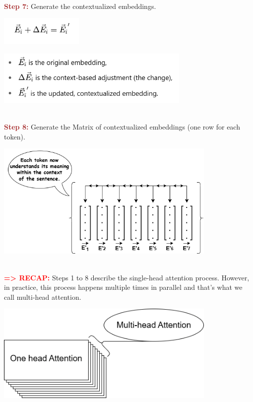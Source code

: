 \documentclass[12pt]{article}
\begin{document}
\textcolor{brown}{\textbf{\\Step 7: }} Generate the contextualized embeddings.\\
\begin{center}
    \includegraphics[width=0.3\textwidth]{images/formula5.png}
\end{center}
\includegraphics[width=0.7\textwidth]{images/formula6.png}

\textcolor{brown}{\textbf{\\Step 8: }} Generate the Matrix of contextualized embeddings (one row for each token).

\begin{center}
    \includegraphics[width=0.8\textwidth]{images/llm6.png}
\end{center}



\textcolor{red}{\textbf{\\=> RECAP:}} Steps 1 to 8 describe the single-head attention process.
However, in practice, this process happens multiple times in parallel and that’s what we call multi-head attention.\\


\begin{center}
    \includegraphics[width=0.8\textwidth]{images/llm7.png}
\end{center}
\end{document}
